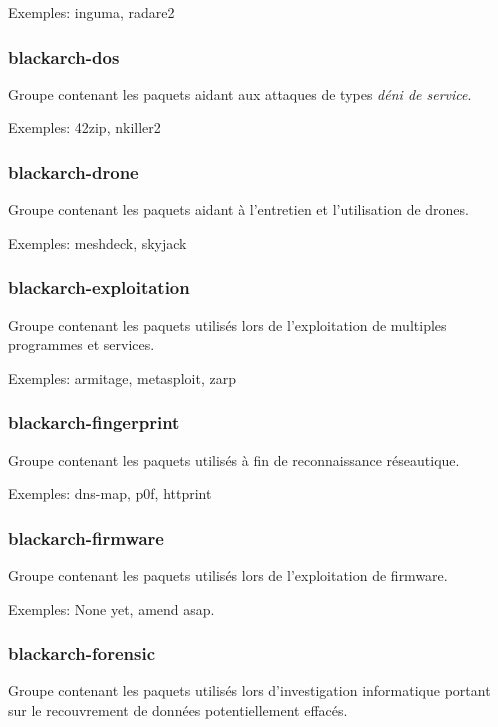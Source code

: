 \documentclass[a4paper, oneside, 11pt]{book}
\begin{document}
Exemples: inguma, radare2

\subsubsection{blackarch-dos}

Groupe contenant les paquets aidant aux attaques de types \textit{déni de service}.

Exemples: 42zip, nkiller2

\subsubsection{blackarch-drone}

Groupe contenant les paquets aidant à l'entretien et l'utilisation de drones.

Exemples: meshdeck, skyjack

\subsubsection{blackarch-exploitation}

Groupe contenant les paquets utilisés lors de l'exploitation de multiples 
programmes et services.

Exemples: armitage, metasploit, zarp

\subsubsection{blackarch-fingerprint}

Groupe contenant les paquets utilisés à fin de reconnaissance réseautique.

Exemples: dns-map, p0f, httprint

\subsubsection{blackarch-firmware}

Groupe contenant les paquets utilisés lors de l'exploitation de firmware.

Exemples: None yet, amend asap.

\subsubsection{blackarch-forensic}

Groupe contenant les paquets utilisés lors d'investigation informatique portant
sur le recouvrement de données potentiellement effacés.
\end{document}
